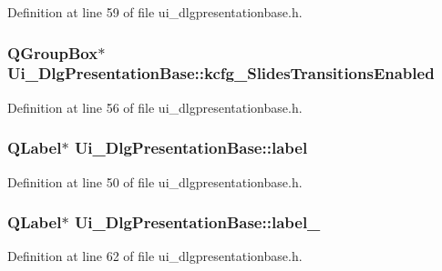 Definition at line 59 of file ui\+\_\+dlgpresentationbase.\+h.

\hypertarget{classUi__DlgPresentationBase_a489f5852bca9a8fa374373464e6471c5}{
\subsubsection[{kcfg\+\_\+\+Slides\+Transitions\+Enabled}]{\setlength{\rightskip}{0pt plus 5cm}Q\+Group\+Box$\ast$ Ui\+\_\+\+Dlg\+Presentation\+Base\+::kcfg\+\_\+\+Slides\+Transitions\+Enabled}}\label{classUi__DlgPresentationBase_a489f5852bca9a8fa374373464e6471c5}


Definition at line 56 of file ui\+\_\+dlgpresentationbase.\+h.

\hypertarget{classUi__DlgPresentationBase_ae5123efd7c909bb49d9f9e1252f807e0}{
\subsubsection[{label}]{\setlength{\rightskip}{0pt plus 5cm}Q\+Label$\ast$ Ui\+\_\+\+Dlg\+Presentation\+Base\+::label}}\label{classUi__DlgPresentationBase_ae5123efd7c909bb49d9f9e1252f807e0}


Definition at line 50 of file ui\+\_\+dlgpresentationbase.\+h.

\hypertarget{classUi__DlgPresentationBase_a7a25c76fb858e7c2bf5626fe8d46414c}{
\subsubsection[{label\+\_\+2}]{\setlength{\rightskip}{0pt plus 5cm}Q\+Label$\ast$ Ui\+\_\+\+Dlg\+Presentation\+Base\+::label\+\_}}\label{classUi__DlgPresentationBase_a7a25c76fb858e7c2bf5626fe8d46414c}


Definition at line 62 of file ui\+\_\+dlgpresentationbase.\+h.

